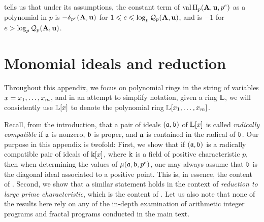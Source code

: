 \documentclass{amsart}
\begin{document}
\begin{remark}
	 tells us that under its assumptions, the constant term of $\operatorname{val} \Pi_p(\mathbf{A},\mathbf{u},p^e)$ as a polynomial in $p$ is $- \delta_{p^e}(\mathbf{A},\mathbf{u})$ for
	$1 \leqslant e \leqslant \log_p \mathcal{Q}_p(\mathbf{A},\mathbf{u})$, and is $-1$ for $e > \log_p \mathcal{Q}_p(\mathbf{A},\mathbf{u})$.
\end{remark}


\newpage
\appendix

\section{Monomial ideals and reduction}
\label{monomial-reduction: A}

Throughout this appendix, we focus on polynomial rings in the string of variables $x = x_1, \ldots, x_m$, and in an attempt to simplify notation,  given a ring $\mathbb{L}$, we will {consistently} use $\mathbb{L}[x]$ to denote the polynomial ring $\mathbb{L}[x_1, \ldots, x_m]$.

Recall, from {the introduction}, that a pair of ideals $(\mathfrak{a}, \mathfrak{b})$ of $\mathbb{L}[x]$ is called \emph{radically compatible}
if $\mathfrak{a}$ is nonzero, $\mathfrak{b}$ is proper, and $\mathfrak{a}$ is contained in the radical of $\mathfrak{b}$.  
Our purpose in this appendix is twofold:  First, we show that if $(\mathfrak{a}, \mathfrak{b})$ is a radically compatible pair of ideals of $\Bbbk[x]$, where $\Bbbk$ is a field of positive characteristic $p$, then when determining the values of $\mu(\mathfrak{a}, \mathfrak{b}, p^e)$, one may always assume that $\mathfrak{b}$ is the diagonal ideal associated to a positive point.   This is, in essence, the content of .  Second, we show that a similar statement holds in the context of \emph{reduction to large prime characteristic}, which is the content of .
Let us also note that none of the results here rely on any of the in-depth examination of arithmetic integer programs and fractal programs conducted in the main text. 
\end{document}

